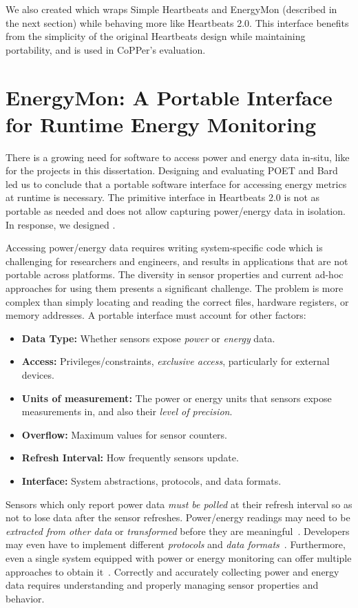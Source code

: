 We also created  which wraps Simple Heartbeats and EnergyMon (described in the next section) while behaving more like Heartbeats 2.0.
This interface benefits from the simplicity of the original Heartbeats design while maintaining portability, and is used in CoPPer's evaluation.


\section{EnergyMon: A Portable Interface for Runtime Energy Monitoring}
\label{app:energymon}

There is a growing need for software to access power and energy data in-situ, like for the projects in this dissertation.
Designing and evaluating POET and Bard led us to conclude that a portable software interface for accessing energy metrics at runtime is necessary.
The primitive interface in Heartbeats 2.0 is not as portable as needed and does not allow capturing power/energy data in isolation.
In response, we designed .

Accessing power/energy data requires writing system-specific code which is challenging for researchers and engineers, and results in applications that are not portable across platforms.
The diversity in sensor properties and current ad-hoc approaches for using them presents a significant challenge.
The problem is more complex than simply locating and reading the correct files, hardware registers, or memory addresses.
A portable interface must account for other factors:
\begin{itemize}
\item \textbf{Data Type:} Whether sensors expose \emph{power} or \emph{energy} data.
\item \textbf{Access:} Privileges/constraints, \eg \emph{exclusive access}, particularly for external devices.
\item \textbf{Units of measurement:} The power or energy units that sensors expose measurements in, and also their \emph{level of precision}.
\item \textbf{Overflow:} Maximum values for sensor counters.
\item \textbf{Refresh Interval:} How frequently sensors update.
\item \textbf{Interface:} System abstractions, protocols, and data formats.
\end{itemize}
Sensors which only report power data \emph{must be polled} at their refresh interval so as not to lose data after the sensor refreshes.
Power/energy readings may need to be \emph{extracted from other data} or \emph{transformed} before they are meaningful~\cite{WattsUp,OSP,SandyBridge}.
Developers may even have to implement different \emph{protocols} and \emph{data formats}~\cite{WattsUp,OSP}.
Furthermore, even a single system equipped with power or energy monitoring can offer multiple approaches to obtain it~\cite{RAPL,ina231,SandyBridge}.
Correctly and accurately collecting power and energy data requires understanding and properly managing sensor properties and behavior.

